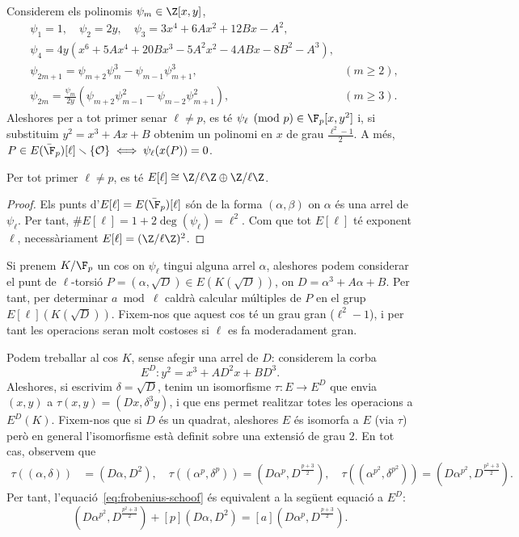  \begin{theorem}
 \label{thm:division-polys}
  Considerem els polinomis $\psi_m\in\Z[x,y]$,
  \begin{align*}
  &\psi_1=1,\quad \psi_2=2y,\quad \psi_3 = 3x^4+6Ax^2+12Bx-A^2,\\
  &\psi_4=4y(x^6+5Ax^4+20Bx^3-5A^2x^2-4ABx-8B^2-A^3),\\
  &\psi_{2m+1}=\psi_{m+2}\psi_{m}^3 - \psi_{m-1}\psi_{m+1}^3,& (m\geq 2),\\
  &\psi_{2m}=\frac{\psi_m}{2y}(\psi_{m+2}\psi_{m-1}^2-\psi_{m-2}\psi_{m+1}^2),& (m\geq 3).
  \end{align*}
  Aleshores per a tot primer senar $\ell\neq p$, es té $\psi_\ell \pmod p \in \F_p[x,y^2]$ i, si substituim $y^2=x^3+Ax+B$ obtenim un polinomi en $x$ de grau $\frac{\ell^2-1}{2}$. A més, $P\in E(\bar\F_p)[\ell]\smallsetminus\{\calO\}\iff \psi_\ell(x(P))=0$.
 \end{theorem}
 \begin{corollary}
 Per tot primer $\ell\neq p$, es té $E[\ell]\cong\Z/\ell\Z\oplus\Z/\ell\Z$.
 \end{corollary}
 \begin{proof}
  Els punts d'$E[\ell]=E(\bar\F_p)[\ell]$ són de la forma $(\alpha, \beta)$ on $\alpha$ és una arrel de $\psi_\ell$. Per tant, $\# E[\ell]=1+2\deg(\psi_\ell)=\ell^2$. Com que tot $E[\ell]$ té exponent $\ell$,  necessàriament $E[\ell]=(\Z/\ell\Z)^2$.
 \end{proof}
 Si prenem $K/\F_p$ un cos on $\psi_\ell$ tingui alguna arrel $\alpha$, aleshores podem considerar el punt de $\ell$-torsió $P=(\alpha,\sqrt{D})\in E(K(\sqrt{D}))$, on $D=\alpha^3+A\alpha+B$. Per tant, per determinar $a\bmod \ell$ caldrà calcular múltiples de $P$ en el grup $E[\ell](K(\sqrt{D}))$. Fixem-nos que aquest cos té un grau gran ($\ell^2-1$), i per tant les operacions seran molt costoses si $\ell$ es fa moderadament gran.
 
 Podem treballar al cos $K$, sense afegir una arrel de $D$: considerem la corba
 \[
 E^D \colon y^2 = x^3 + AD^2x + BD^3.
 \]
 Aleshores, si escrivim $\delta=\sqrt{D}$, tenim un isomorfisme $\tau\colon E\to E^D$ que envia $(x,y)$ a $\tau(x,y)=(Dx,\delta^3y)$, i que ens permet realitzar totes les operacions a $E^D(K)$. Fixem-nos que si $D$ és un quadrat, aleshores $E$ és isomorfa a $E$ (via $\tau$) però en general l'isomorfisme està definit sobre una extensió de grau $2$. En tot cas, observem que
\begin{align*}
    \tau((\alpha,\delta)) &= (D\alpha, D^2),\quad \tau((\alpha^p,\delta^p))=(D\alpha^p,D^{\frac{p+3}{2}}),\quad
    \tau((\alpha^{p^2},\delta^{p^2})) =(D\alpha^{p^2},D^{\frac{p^2+3}{2}}).
\end{align*}
Per tant, l'equació~\eqref{eq:frobenius-schoof} és equivalent a la següent equació a $E^D$:
\[
(D\alpha^{p^2},D^{\frac{p^2+3}{2}}) + [p] (D\alpha,D^2) = [a] (D\alpha^p,D^{\frac{p+3}{2}}).
\]


